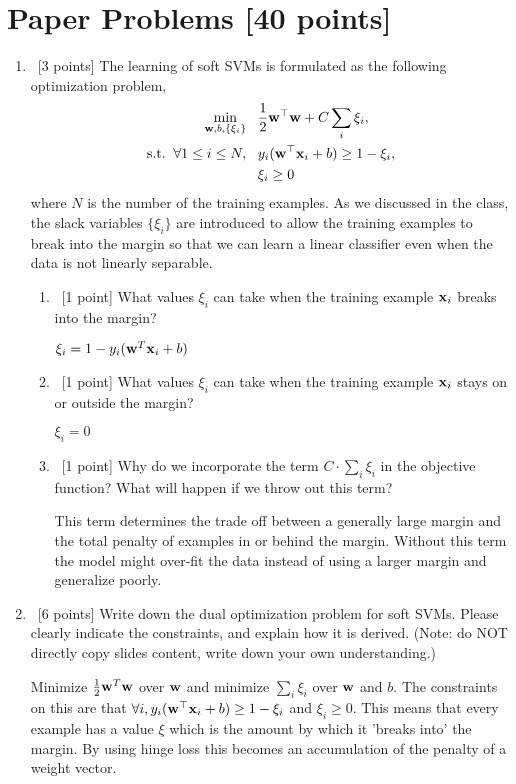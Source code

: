 \documentclass[12pt, fullpage,letterpaper]{article}
\begin{document}
\section{Paper Problems [40 points]}
\begin{enumerate}
	\item~[3 points] The learning of soft SVMs is formulated as the following optimization problem,
		\begin{align}
		\min\limits_{{\bf w}, b, \{\xi_i\}} &\;\;\;\frac{1}{2}{\bf w}^\top{\bf w} + C\sum_i \xi_i, \nonumber\\
		\mathrm{s.t.}\;\; \forall 1 \le i \le N, &\;\;\; y_i({\bf w}^\top {\bf x}_i + b) \ge 1 - \xi_i , \nonumber \\
		&\;\;\; \xi_i \ge 0 \nonumber
		\end{align}
		where $N$ is the number of the training examples.
	As we discussed in the class, the slack variables $\{\xi_i\}$ are introduced to allow the training examples to break into the margin so that we can learn a linear classifier even when the data is not linearly separable. 
	\begin{enumerate}
		\item~[1 point] What values $\xi_i$ can take when the training example ${\bf x}_i$ breaks into the margin? 
		
		$\xi_i = 1 - y_i ({\bf w}^T{\bf x}_i+b)$
		
		\item~[1 point] What values $\xi_i$ can take when the training example ${\bf x}_i$ stays on or outside the margin? 
		
		$\xi_i = 0$
		
		\item~[1 point] Why do we incorporate the term $C\cdot\sum_i \xi_i $ in the objective function? What will happen if we throw out this term?
		
		This term determines the trade off between a generally large margin and the total penalty of examples in or behind the margin. Without this term the model might over-fit the data instead of using a larger margin and generalize poorly.
		
	\end{enumerate}
	
	
	\item~[6 points] Write down the dual optimization problem for soft SVMs.  
	Please clearly indicate the constraints, and explain how it is derived. (Note: do NOT directly copy slides content, write down your own understanding.)
	
	Minimize $\frac{1}{2}{\bf w}^T{\bf w}$ over ${\bf w}$ and minimize $\sum_i \xi_i$ over ${\bf w}$ and $b$. The constraints on this are that $\forall i, y_i({\bf w}^\top {\bf x}_i + b) \ge 1 - \xi_i$ and $\xi_i \ge 0$. This means that every example has a value $\xi$ which is the amount by which it 'breaks into' the margin. By using hinge loss this becomes an accumulation of the penalty of a weight vector.
	

\end{enumerate}
\end{document}
